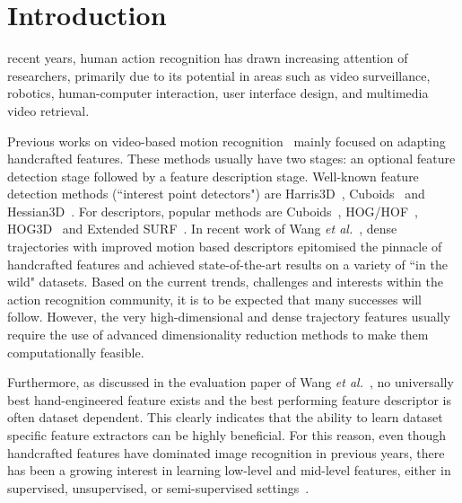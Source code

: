 

\section{Introduction}
\label{sec:introduction}

 recent years, human action recognition has drawn increasing attention of researchers, primarily due to its potential in areas such as video surveillance, robotics, human-computer interaction, user interface design, and multimedia video retrieval.

Previous works on video-based motion recognition~\cite{liuli,xiantong,diwu2} mainly focused on adapting handcrafted features. %
These methods usually have two stages: an optional feature detection stage followed by a feature description stage. Well-known feature detection methods (``interest point detectors") are Harris3D~\cite{laptev2005space}, Cuboids~\cite{dollar2005behavior} and Hessian3D~\cite{hession3d}. For descriptors, popular methods are Cuboids~\cite{scovanner20073}, HOG/HOF~\cite{laptev2005space}, HOG3D~\cite{klaser:inria-00514853} and Extended SURF~\cite{hession3d}.
In recent work of Wang \textit{et al.}~\cite{wang2013dense}, dense trajectories with improved motion based descriptors epitomised the pinnacle of handcrafted features and achieved state-of-the-art results on a variety of ``in the wild" datasets.
Based on the current trends, challenges and interests within the action recognition community, it is to be expected that many successes will follow. However, the very high-dimensional and dense trajectory features usually require the use of advanced dimensionality reduction methods to make them computationally feasible.

Furthermore, as discussed in the evaluation paper of Wang \emph{et al.}~\cite{wang2009evaluation}, no universally best hand-engineered feature exists and the best performing feature descriptor is often dataset dependent. This clearly indicates that the ability to learn dataset specific feature extractors can be highly beneficial.
For this reason, even though handcrafted features have dominated image recognition in previous years, there has been a growing interest in learning low-level and mid-level features, either in supervised, unsupervised, or semi-supervised settings~\cite{taylor2010convolutional,le2011learning,baccouche2005spatio}.

